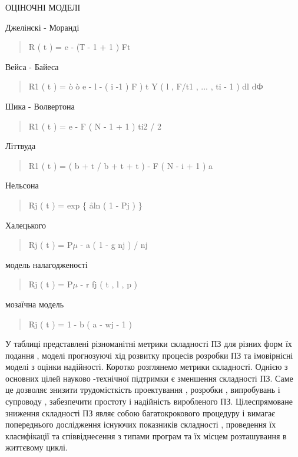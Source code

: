 \documentclass[oneside,final,14pt]{extreport}
\begin{document}
ОЦІНОЧНІ МОДЕЛІ

Джелінскі - Моранді
\begin{quote}

R ( t ) = e - (Т - 1 + 1 ) Ft
\end{quote}

Вейса - Байеса
\begin{quote}

R1 ( t ) = ò ò e - l - ( i -1 ) F ) t Y ( l , F/t1 , ... , ti - 1 ) dl dФ
\end{quote}

Шика - Волвертона
\begin{quote}

R1 ( t ) = e - F ( N - 1 + 1 ) ti2 / 2
\end{quote}

Літтвуда
\begin{quote}

R1 ( t ) = ( b + t / b + t + t ) - F ( N - i + 1 ) a
\end{quote}

Нельсона
\begin{quote}

Rj ( t ) = exp \{ åln ( 1 - Pj ) \}
\end{quote}

Халецького
\begin{quote}

Rj ( t ) = P\(\mu\) - a ( 1 - g nj ) / nj
\end{quote}

модель налагодженості
\begin{quote}

Rj ( t ) = P\(\mu\) - r fj ( t , l , p )
\end{quote}

мозаїчна модель
\begin{quote}

Rj ( t ) = 1 - b ( a - wj - 1 )
\end{quote}

У таблиці представлені різноманітні метрики складності ПЗ для різних форм їх подання , моделі прогнозуючі хід розвитку процесів розробки ПЗ та імовірнісні моделі з оцінки надійності.
Коротко розглянемо метрики складності. Однією з основних цілей науково -технічної підтримки є зменшення складності ПЗ. Саме це дозволяє знизити трудомісткість проектування , розробки , випробувань і супроводу , забезпечити простоту і надійність виробленого ПЗ. Цілеспрямоване зниження складності ПЗ являє собою багатокрокового процедуру і вимагає попереднього дослідження існуючих показників складності , проведення їх класифікації та співвіднесення з типами програм та їх місцем розташування в життєвому циклі.
\end{document}
